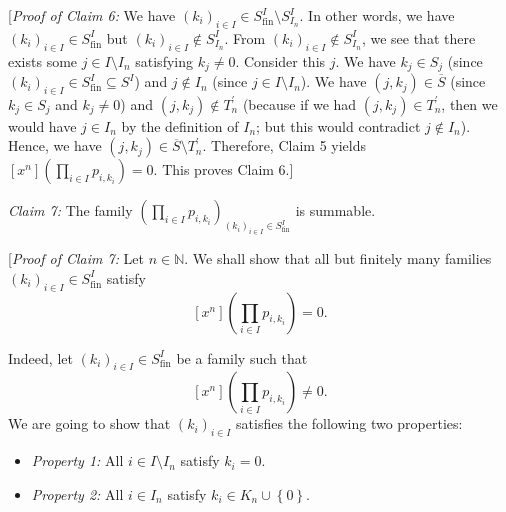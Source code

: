 [\textit{Proof of Claim 6:} We have $\left(  k_{i}\right)  _{i\in I}\in
S_{\operatorname*{fin}}^{I}\setminus S_{I_{n}}^{I}$. In other words, we have
$\left(  k_{i}\right)  _{i\in I}\in S_{\operatorname*{fin}}^{I}$ but $\left(
k_{i}\right)  _{i\in I}\notin S_{I_{n}}^{I}$. From $\left(  k_{i}\right)
_{i\in I}\notin S_{I_{n}}^{I}$, we see that there exists some $j\in I\setminus
I_{n}$ satisfying $k_{j}\neq0$. Consider this $j$. We have $k_{j}\in S_{j}$
(since $\left(  k_{i}\right)  _{i\in I}\in S_{\operatorname*{fin}}%
^{I}\subseteq S^{I}$) and $j\notin I_{n}$ (since $j\in I\setminus I_{n}$). We
have $\left(  j,k_{j}\right)  \in\overline{S}$ (since $k_{j}\in S_{j}$ and
$k_{j}\neq0$) and $\left(  j,k_{j}\right)  \notin T_{n}^{\prime}$ (because if
we had $\left(  j,k_{j}\right)  \in T_{n}^{\prime}$, then we would have $j\in
I_{n}$ by the definition of $I_{n}$; but this would contradict $j\notin I_{n}%
$). Hence, we have $\left(  j,k_{j}\right)  \in\overline{S}\setminus
T_{n}^{\prime}$. Therefore, Claim 5 yields $\left[  x^{n}\right]  \left(
\prod_{i\in I}p_{i,k_{i}}\right)  =0$. This proves Claim 6.]

\begin{statement}
\textit{Claim 7:} The family $\left(  \prod_{i\in I}p_{i,k_{i}}\right)
_{\left(  k_{i}\right)  _{i\in I}\in S_{\operatorname*{fin}}^{I}}$ is summable.
\end{statement}

[\textit{Proof of Claim 7:} Let $n\in\mathbb{N}$. We shall show that all but
finitely many families $\left(  k_{i}\right)  _{i\in I}\in
S_{\operatorname*{fin}}^{I}$ satisfy
\[
\left[  x^{n}\right]  \left(  \prod_{i\in I}p_{i,k_{i}}\right)  =0.
\]


Indeed, let $\left(  k_{i}\right)  _{i\in I}\in S_{\operatorname*{fin}}^{I}$
be a family such that
\begin{equation}
\left[  x^{n}\right]  \left(  \prod_{i\in I}p_{i,k_{i}}\right)  \neq0.
\label{pf.prop.fps.prodrule-fin-inf.c7.pf.ass}%
\end{equation}
We are going to show that $\left(  k_{i}\right)  _{i\in I}$ satisfies the
following two properties:

\begin{itemize}
\item \textit{Property 1:} All $i\in I\setminus I_{n}$ satisfy $k_{i}=0$.

\item \textit{Property 2:} All $i\in I_{n}$ satisfy $k_{i}\in K_{n}%
\cup\left\{  0\right\}  $.
\end{itemize}

